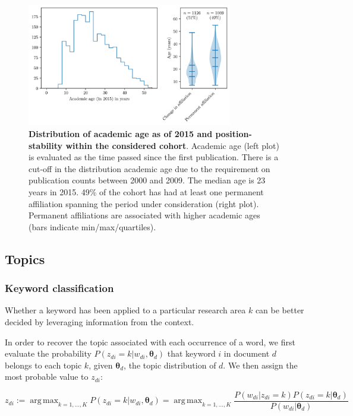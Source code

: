 \documentclass{article}
\DeclareMathOperator*{\argmax}{arg\,max}
\begin{document}
\begin{figure}[H]
    \centering
    \includegraphics[width=0.8\textwidth]{plots/sample_characteristics.png}
    \caption{\textbf{Distribution of academic age as of 2015 and position-stability within the considered cohort}.  Academic age (left plot) is evaluated as the time passed since the first publication. There is a cut-off in the distribution academic age due to the requirement on publication counts between 2000 and 2009. The median age is 23 years in 2015. 49\% of the cohort has had at least one permanent affiliation spanning the period under consideration (right plot). Permanent affiliations are associated with higher academic ages (bars indicate min/max/quartiles). }
    \label{fig:sample_characteristics}
\end{figure}

\subsection{\label{appendix:topics}Topics}

\subsubsection{\label{appendix:keywords}Keyword classification}

Whether a keyword has been applied to a particular research area $k$ can be better decided by leveraging information from the context.

In order to recover the topic associated with each occurrence of a word, we first evaluate the probability $P(z_{di}=k|w_{di},\bm{\theta}_{d})$ that keyword $i$ in document $d$ belongs to each topic $k$, given $\bm{\theta}_d$, the topic distribution of $d$. We then assign the most probable value to $z_{di}$:

\begin{equation}
    z_{di} := \argmax_{k=1,\dots,K} P(z_{di}=k|w_{di},\bm{\theta}_{d}) =  \argmax_{k=1,\dots,K} \dfrac{P(w_{di}|z_{di}=k)P(z_{di}=k|\bm{\theta}_d)}{P(w_{di}|\bm{\theta}_d)}
\end{equation}
\end{document}
